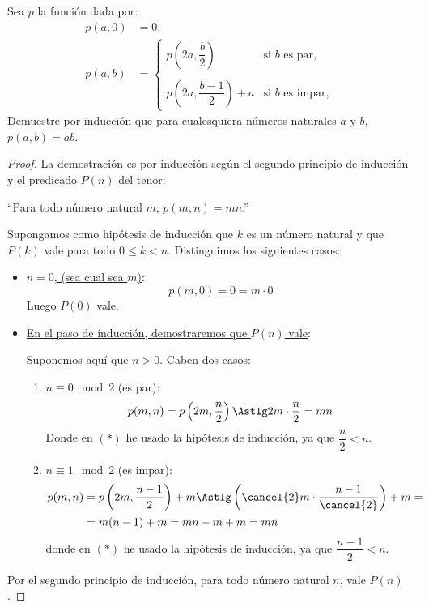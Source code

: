 \begin{ejercicio}
Sea $p$ la función dada por:
    \begin{align*}
        p(a,0) &= 0,\\
        p(a,b) &= \left\{ \begin{array}{ll}
            p\left(2a,\dfrac{b}{2}\right) & \text{si } b \text{ es par, }\\
                                        & \\
            p\left(2a,\dfrac{b-1}{2}\right)+a & \text{si } b \text{ es impar, }
    \end{array}\right.
    \end{align*}
    Demuestre por inducción que para cualesquiera números naturales $a$ y $b$, $p(a,b) = ab$.
    \begin{comment}
        Notemos que esta función pasa a binario $b$ y almacena en $a$ tantos ''$2$'' como el popcount de $b$.
    \end{comment}
    \begin{proof}
       La demostración es por inducción según el segundo principio de inducción y el predicado $P(n)$ del tenor: 
        \begin{center}
            ``Para todo número natural $m$, $p(m,n) = mn$.''
        \end{center}
        Supongamos como hipótesis de inducción que $k$ es un número natural y que $P(k)$ vale para todo $0 \leq k < n$. Distinguimos los siguientes casos:
        \begin{itemize}
            \item \ul{$n=0$, (sea cual sea $m$)}:
                $$p(m,0) = 0 = m \cdot 0$$
                Luego $P(0)$ vale.
            \item \ul{En el paso de inducción, demostraremos que $P(n)$ vale}:

            Suponemos aquí que $n>0$. Caben dos casos:
                \begin{enumerate}
                    \item \ul{$n\equiv 0\mod 2$} (es par):
                        $$p(m,n) = p\left(2m, \dfrac{n}{2}\right) \AstIg 2m \cdot \dfrac{n}{2}=mn$$
                        Donde en $(\ast)$ he usado la hipótesis de inducción, ya que $\dfrac{n}{2} < n$.
                    \item \ul{$n\equiv 1\mod 2$} (es impar):
                        \begin{align*}
                            p(m,n) &= p\left(2m, \dfrac{n-1}{2}\right)+m \AstIg \left( \cancel{2}m \cdot \dfrac{n-1}{\cancel{2}}\right) +m =\\
                                    &= m(n-1)+m = mn-m+m = mn
                        \end{align*}
                        donde en $(\ast)$ he usado la hipótesis de inducción, ya que $\dfrac{n-1}{2} < n$.
                \end{enumerate}
        \end{itemize}
        Por el segundo principio de inducción, para todo número natural $n$, vale $P(n)$.
    \end{proof}
\end{ejercicio}
